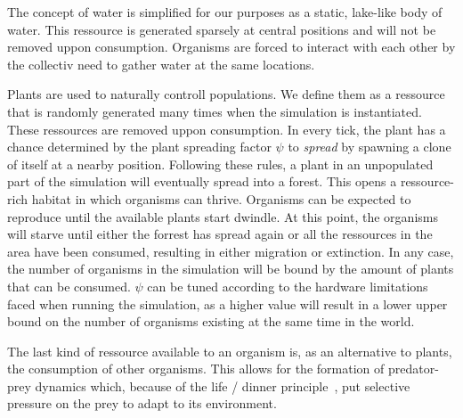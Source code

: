 The concept of water is simplified for our purposes as a static, lake-like body of water.
This ressource is generated sparsely at central positions and will not be removed uppon consumption.
Organisms are forced to interact with each other by the collectiv need to gather water at the same locations.

Plants are used to naturally controll populations. We define them as a ressource that is randomly generated
many times when the simulation is instantiated. These ressources are removed uppon consumption. In every tick, 
the plant has a chance determined by the plant spreading factor \(\psi \) to \emph{spread} by spawning a clone of itself
at a nearby position. Following these rules, a plant in an unpopulated part of the simulation will eventually spread 
into a forest.
This opens a ressource-rich habitat in which organisms can thrive. Organisms can be expected to 
reproduce until the available plants start dwindle. At this point, the organisms will starve until either 
the forrest has spread again or all the ressources in the area have been consumed, resulting in either
migration or extinction. In any case, the number of organisms in the simulation will be bound by the amount of 
plants that can be consumed. 
\(\psi \) can be tuned according to the hardware limitations faced when running the simulation, as a higher value
will result in a lower upper bound on the number of organisms existing at the same time in the world.

The last kind of ressource available to an organism is, as an alternative to plants, the consumption of 
other organisms. This allows for the formation of predator-prey dynamics which, 
because of the life / dinner principle~\cite{Dawkins1982}, put selective pressure on the prey to adapt to its 
environment.
